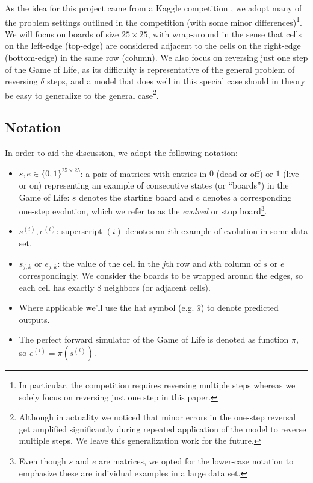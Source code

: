 \documentclass[conference]{IEEEtran}
\begin{document}
As the idea for this project came from a Kaggle competition \cite{Kaggle}, we adopt many of the problem settings outlined in the competition (with some minor differences)\footnote{In particular, the competition requires reversing multiple steps whereas we solely focus on reversing just one step in this paper.}. \label{wraparoundboard} We will focus on boards of size $25 \times 25$, with wrap-around in the sense that cells on the left-edge (top-edge) are considered adjacent to the cells on the right-edge (bottom-edge) in the same row (column). We also focus on reversing just one step of the Game of Life, as its difficulty is representative of the general problem of reversing $\delta$ steps, and a model that does well in this special case should in theory be easy to generalize to the general case\footnote{Although in actuality we noticed that minor errors in the one-step reversal get amplified significantly during repeated application of the model to reverse multiple steps. We leave this generalization work for the future.}.

\subsection{Notation}
In order to aid the discussion, we adopt the following notation:

\begin{itemize}
    \item $s, e \in \{0, 1\}^{25\times 25}$: a pair of matrices with entries in $0$ (dead or off) or $1$ (live or on) representing an example of consecutive states (or ``boards'') in the Game of Life: $s$ denotes the starting board and $e$ denotes a corresponding one-step evolution, which we refer to as the \emph{evolved} or stop board\footnote{Even though $s$ and $e$ are matrices, we opted for the lower-case notation to emphasize these are individual examples in a large data set.}.
    \item $s^{(i)}, e^{(i)}$: superscript $(i)$ denotes an $i$th example of evolution in some data set.
    \item $s_{j,k}$ or $e_{j,k}$: the value of the cell in the $j$th row and $k$th column of $s$ or $e$ correspondingly. We consider the boards to be wrapped around the edges, so each cell has exactly 8 neighbors (or adjacent cells).
    \item Where applicable we'll use the hat symbol (e.g. $\hat s$) to denote predicted outputs.
    \item The perfect forward simulator of the Game of Life is denoted as function $\pi$, so $e^{(i)} = \pi(s^{(i)})$.
\end{itemize}
\end{document}
